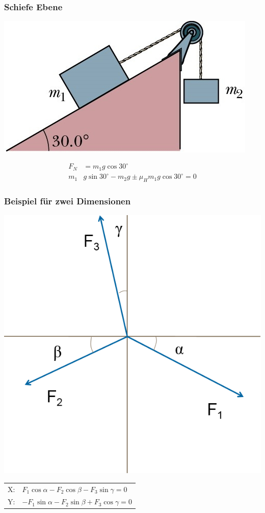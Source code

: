 \documentclass[a4paper]{scrartcl}
\begin{document}
\subsubsection{Schiefe Ebene}
	\begin{multicols}{2}
		\includegraphics[width=\linewidth]{img/reibung_schiefe_ebene.jpg}
		
		\begin{align*}
			F_N &= m_1 g \cos 30^\circ \\
			m_1 &g \sin 30^\circ - m_2 g \pm \mu_Hm_1g \cos 30^\circ = 0
		\end{align*}
	\end{multicols}

\subsubsection{Beispiel für zwei Dimensionen}
	\begin{multicols}{2}
		\includegraphics[width=0.5\linewidth]{img/massenpunkt}
		
		\begin{tabu}{l X}
			X: & $F_1 \cos \alpha - F_2 \cos \beta - F_3 \sin \gamma = 0$\\
			Y: & $-F_1 \sin \alpha - F_2 \sin \beta + F_3 \cos \gamma = 0$
		\end{tabu}
	\end{multicols}
\end{document}
